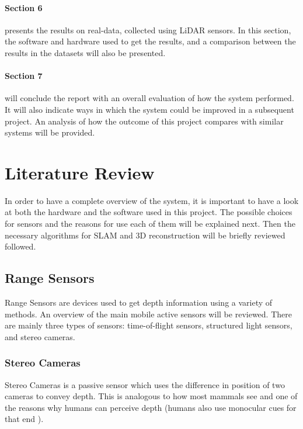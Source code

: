 \documentclass[11pt]{article}
\begin{document}
\paragraph{Section 6} presents the results on real-data, collected using LiDAR sensors. In this section, the software and hardware used to get the results, and a comparison between the results in the datasets will also be presented.
		
\paragraph{Section 7} will conclude the report with an overall evaluation of how the system performed. It will also indicate ways in which the system could be improved in a subsequent project. An analysis of how the outcome of this project compares with similar systems will be provided.

	\newpage
	\section{Literature Review}

In order to have a complete overview of the system, it is important to have a look at both the hardware and the software used in this project. The possible choices for sensors and the reasons for use each of them will be explained next. Then the necessary algorithms for SLAM and 3D reconstruction will be briefly reviewed followed.

	\subsection{Range Sensors}
	\label{subs:RangeSensors}
	
Range Sensors are devices used to get depth information using a variety of methods. An overview of the main mobile active sensors will be reviewed. There are mainly three types of sensors: time-of-flight sensors, structured light sensors, and stereo cameras.

	\subsubsection{Stereo Cameras}
	
Stereo Cameras is a passive sensor which uses the difference in position of two cameras to convey depth. This is analogous to how most mammals see and one of the reasons why humans can perceive depth (humans also use monocular cues for that end \cite{goldstein2016sensation}).
\end{document}
